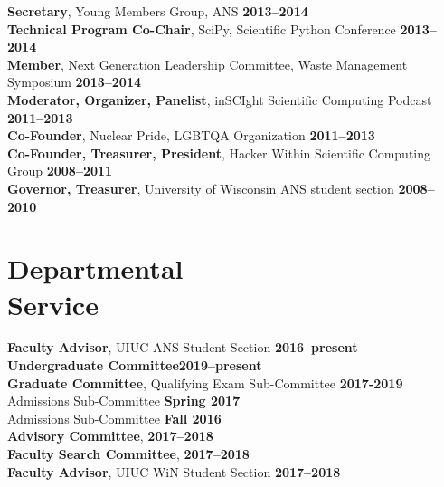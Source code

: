 \documentclass[margin,line]{resume}
\begin{document}
\begin{resume}
                \textbf{Secretary}, Young Members Group, ANS  \hfill \textbf{2013--2014}\vspace{.5mm}\\%
                \textbf{Technical Program Co-Chair}, SciPy, Scientific Python Conference   \hfill \textbf{2013--2014}\vspace{.5mm}\\%
                \textbf{Member}, Next Generation Leadership Committee, Waste Management Symposium  \hfill \textbf{2013--2014}\vspace{.5mm}\\%
                \textbf{Moderator, Organizer, Panelist}, inSCIght Scientific Computing Podcast  \hfill \textbf{2011--2013}\vspace{.5mm}\\%
                \textbf{Co-Founder}, Nuclear Pride, LGBTQA Organization  \hfill \textbf{2011--2013}\vspace{.5mm}\\%
                \textbf{Co-Founder, Treasurer, President}, Hacker Within Scientific Computing Group  \hfill \textbf{2008--2011}\vspace{.5mm}\\%
                \textbf{Governor, Treasurer}, University of Wisconsin ANS student section  \hfill \textbf{2008--2010}\vspace{.5mm}%
    \section{\mysidestyle Departmental\\Service}
                \textbf{Faculty Advisor}, UIUC ANS Student Section \hfill \textbf{2016--present}\vspace{.5mm}\\%
                \textbf{Undergraduate Committee}\hfill \textbf{2019--present}\vspace{.5mm}\\%
                \textbf{Graduate Committee}, Qualifying Exam Sub-Committee \hfill \textbf{2017-2019}\vspace{.5mm}\\%
                                             Admissions Sub-Committee \hfill \textbf{Spring 2017}\vspace{.5mm}\\%
                                             Admissions Sub-Committee \hfill \textbf{Fall 2016}\vspace{.5mm}\\%
                \textbf{Advisory Committee}, \hfill \textbf{2017--2018}\vspace{.5mm}\\%
                \textbf{Faculty Search Committee}, \hfill \textbf{2017--2018}\vspace{.5mm}\\%
                \textbf{Faculty Advisor}, UIUC WiN Student Section \hfill \textbf{2017--2018}\vspace{.5mm}\\%

\end{resume}
\end{document}
